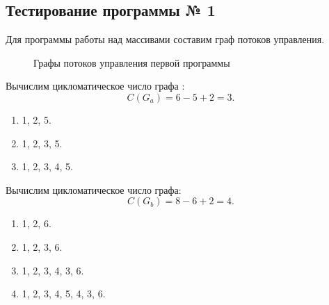 \documentclass[a4paper,14pt]{extarticle}
\begin{document}
    \subsection{Тестирование программы № 1}
    Для программы работы над массивами составим граф потоков управления.
    \begin{figure}[H]
        \centering
        \hspace{.15\linewidth}
        \caption{Графы потоков управления первой программы}
    \end{figure}
    \pagebreak

    Вычислим цикломатическое число графа :
    \begin{equation*}
        C(G_{a}) = 6 - 5 + 2 = 3.
    \end{equation*}
    \begin{enumerate}
        \item 1, 2, 5.
        \item 1, 2, 3, 5.
        \item 1, 2, 3, 4, 5.
    \end{enumerate}

    Вычислим цикломатическое число графа:
    \begin{equation*}
        C(G_{b}) = 8 - 6 + 2 = 4.
    \end{equation*}
    \begin{enumerate}
        \item 1, 2, 6.
        \item 1, 2, 3, 6.
        \item 1, 2, 3, 4, 3, 6.
        \item 1, 2, 3, 4, 5, 4, 3, 6.
    \end{enumerate}
\end{document}
